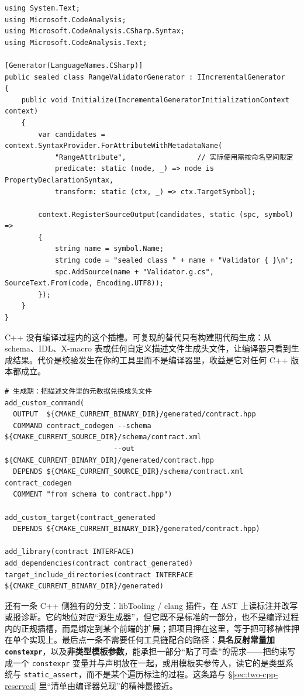 \documentclass[12pt,a4paper,fontset=fandol]{ctexbook}
\newcommand{\cpplabel}{%
  \tcbox[on line,colback=cppheadbg,colframe=cppheadbg,
    boxrule=0pt,arc=1pt,left=2pt,right=2pt,top=1pt,bottom=1pt,
    colupper=white,fontupper=\scriptsize\bfseries]{C++}}
\newcommand{\csharplabel}{%
  \tcbox[on line,colback=csharpheadbg,colframe=csharpheadbg,
    boxrule=0pt,arc=1pt,left=2pt,right=2pt,top=1pt,bottom=1pt,
    colupper=white,fontupper=\scriptsize\bfseries]{C\#}}
\newcommand{\cpp}[1]{C++#1}
\begin{document}
\csharplabel
\begin{lstlisting}[style=csharpstyle,caption={增量源生成器骨架：读语法与语义模型，追加文件，可参与增量},label={lst:ch3-cs-generator}]
using System.Text;
using Microsoft.CodeAnalysis;
using Microsoft.CodeAnalysis.CSharp.Syntax;
using Microsoft.CodeAnalysis.Text;

[Generator(LanguageNames.CSharp)]
public sealed class RangeValidatorGenerator : IIncrementalGenerator
{
    public void Initialize(IncrementalGeneratorInitializationContext context)
    {
        var candidates = context.SyntaxProvider.ForAttributeWithMetadataName(
            "RangeAttribute",                 // 实际使用需按命名空间限定
            predicate: static (node, _) => node is PropertyDeclarationSyntax,
            transform: static (ctx, _) => ctx.TargetSymbol);

        context.RegisterSourceOutput(candidates, static (spc, symbol) =>
        {
            string name = symbol.Name;
            string code = "sealed class " + name + "Validator { }\n";
            spc.AddSource(name + "Validator.g.cs", SourceText.From(code, Encoding.UTF8));
        });
    }
}
\end{lstlisting}

\cpp{} 没有编译过程内的这个插槽。可复现的替代只有构建期代码生成：从 schema、IDL、X-macro 表或任何自定义描述文件生成头文件，让编译器只看到生成结果。代价是校验发生在你的工具里而不是编译器里，收益是它对任何 \cpp{} 版本都成立。

\cpplabel
\begin{lstlisting}[style=cppstyle,caption={构建期代码生成的 CMake 形态（构建脚本示意，非 C++ 源码；不涉及具体版本号）},label={lst:ch3-cmake}]
# 生成期：把描述文件里的元数据兑换成头文件
add_custom_command(
  OUTPUT  ${CMAKE_CURRENT_BINARY_DIR}/generated/contract.hpp
  COMMAND contract_codegen --schema ${CMAKE_CURRENT_SOURCE_DIR}/schema/contract.xml
                          --out    ${CMAKE_CURRENT_BINARY_DIR}/generated/contract.hpp
  DEPENDS ${CMAKE_CURRENT_SOURCE_DIR}/schema/contract.xml contract_codegen
  COMMENT "from schema to contract.hpp")

add_custom_target(contract_generated
  DEPENDS ${CMAKE_CURRENT_BINARY_DIR}/generated/contract.hpp)

add_library(contract INTERFACE)
add_dependencies(contract contract_generated)
target_include_directories(contract INTERFACE ${CMAKE_CURRENT_BINARY_DIR}/generated)
\end{lstlisting}

还有一条 \cpp{} 侧独有的分支：libTooling / clang 插件，在 AST 上读标注并改写或报诊断。它的地位对应“源生成器”，但它既不是标准的一部分，也不是编译过程内的正规插槽，而是绑定到某个前端的扩展；把项目押在这里，等于把可移植性押在单个实现上。最后点一条不需要任何工具链配合的路径：\textbf{具名反射常量加 \texttt{constexpr}}，以及\textbf{非类型模板参数}，能承担一部分“贴了可查”的需求——把约束写成一个 \texttt{constexpr} 变量并与声明放在一起，或用模板实参传入，读它的是类型系统与 \texttt{static\_assert}，而不是某个遍历标注的过程。这条路与 \S\ref{sec:two-cpp-reserved} 里“清单由编译器兑现”的精神最接近。
\end{document}
